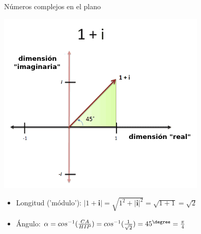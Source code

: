 \documentclass[10pt]{beamer}
\def\ii{\textbf{i}}
\def\m{^{-1}}
\begin{document}
\begin{frame}{Números complejos en el plano}

	\includegraphics[scale=0.8]{1plusi.png}
	
	\pause
	
	\begin{itemize}
	
		\item Longitud ('módulo'): $|1+\ii| = \sqrt{1^2 + |\ii|^2} = \sqrt{1+1} = \sqrt{2}$

		\item Ángulo: $\alpha = cos\m(\frac{CA}{HIP}) = cos\m(\frac{1}{\sqrt{2}}) = 45^\degree = \frac{\pi}{4}$
	\end{itemize}
\end{frame}
\end{document}
